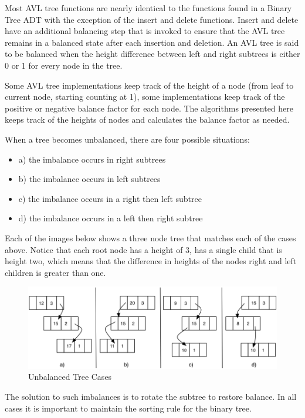 Most AVL tree functions are nearly identical to the functions found in a Binary Tree ADT with the exception of the insert and delete functions. Insert and delete have an additional balancing step that is invoked to ensure that the AVL tree remains in a balanced state after each insertion and deletion. An AVL tree is said to be balanced when the height difference between left and right subtrees is either 0 or 1 for every node in the tree. 

Some AVL tree implementations keep track of the height of a node (from leaf to current node, starting counting at 1), some implementations keep track of the positive or negative balance factor for each node.  The algorithms presented here keeps track of the heights of nodes and calculates the balance factor as needed.

When a tree becomes unbalanced, there are four possible situations:
\begin{itemize}
	\item a) the imbalance occurs in right subtrees
	\item b) the imbalance occurs in left subtrees
	\item c) the imbalance occurs in a right then left subtree
	\item d) the imbalance occurs in a left then right subtree
\end{itemize}


Each of the images below shows a three node tree that matches each of the cases above. Notice that each root node has a height of 3, has a single child that is height two, which means that the difference in heights of the nodes right and left children is greater than one.

\begin{figure}[H]
\centering
\includegraphics{pictures/tree15.png}
\caption{Unbalanced Tree Cases}
\label{fig:tree15}
\end{figure}

The solution to such imbalances is to rotate the subtree to restore balance. In all cases it is important to maintain the sorting rule for the binary tree.

